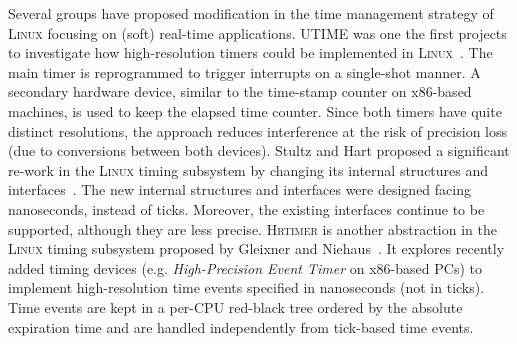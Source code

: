 \documentclass[final,3pd,times]{elsarticle}
\begin{document}
Several groups have proposed modification in the time management
strategy of \textsc{Linux} focusing on (soft) real-time applications.
\textsc{UTIME} was one the first projects to investigate how
high-resolution timers could be implemented in
\textsc{Linux}~\cite{Srinivasan:98}. The main timer is reprogrammed to
trigger interrupts on a single-shot manner. A secondary hardware device,
similar to the time-stamp counter on x86-based machines, is used to keep
the elapsed time counter. Since both timers have quite distinct
resolutions, the approach reduces interference at the risk of precision
loss (due to conversions between both devices).  Stultz and Hart
proposed a significant re-work in the \textsc{Linux} timing subsystem by
changing its internal structures and interfaces~\cite{Stultz:2006}.  The
new internal structures and interfaces were designed facing nanoseconds,
instead of ticks. Moreover, the existing interfaces continue to be
supported, although they are less precise. \textsc{Hrtimer} is another
abstraction in the \textsc{Linux} timing subsystem proposed by Gleixner
and Niehaus~\cite{Gleixner:2006}. It explores recently added timing
devices (e.g. \emph{High-Precision Event Timer} on x86-based PCs) to
implement high-resolution time events specified in nanoseconds (not in
ticks).  Time events are kept in a per-CPU red-black tree ordered by the
absolute expiration time and are handled independently from tick-based
time events.
\end{document}
